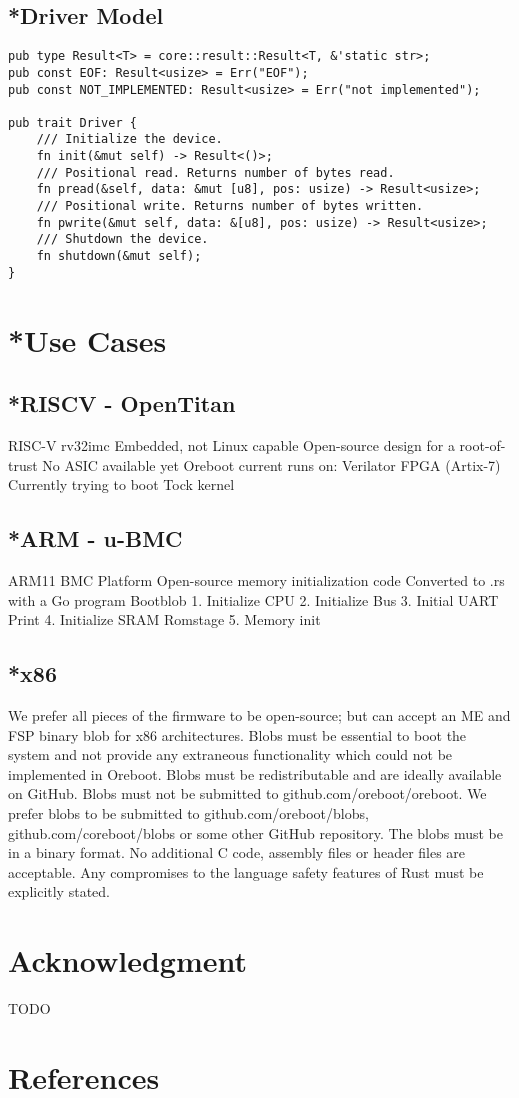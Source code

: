 \documentclass[conference]{IEEEtran}
\begin{document}
\subsection{*Driver Model}

\begin{verbatim}
pub type Result<T> = core::result::Result<T, &'static str>;
pub const EOF: Result<usize> = Err("EOF");
pub const NOT_IMPLEMENTED: Result<usize> = Err("not implemented");

pub trait Driver {
	/// Initialize the device.
	fn init(&mut self) -> Result<()>;
	/// Positional read. Returns number of bytes read.
	fn pread(&self, data: &mut [u8], pos: usize) -> Result<usize>;
	/// Positional write. Returns number of bytes written.
	fn pwrite(&mut self, data: &[u8], pos: usize) -> Result<usize>;
	/// Shutdown the device.
	fn shutdown(&mut self);
}
\end{verbatim}

\section{*Use Cases}

\subsection{*RISCV - OpenTitan}

RISC-V rv32imc
Embedded, not Linux capable
Open-source design for a root-of-trust
No ASIC available yet
Oreboot current runs on:
Verilator
FPGA (Artix-7)
Currently trying to boot Tock kernel

\subsection{*ARM - u-BMC}

ARM11
BMC Platform
Open-source memory initialization code
Converted to .rs with a Go program
Bootblob
1. Initialize CPU
2. Initialize Bus
3. Initial UART Print
4. Initialize SRAM
Romstage
5. Memory init


\subsection{*x86}

We prefer all pieces of the firmware to be open-source; but can accept an ME and FSP binary blob for x86 architectures.
Blobs must be essential to boot the system and not provide any extraneous functionality which could not be implemented in Oreboot.
Blobs must be redistributable and are ideally available on GitHub.
Blobs must not be submitted to github.com/oreboot/oreboot. We prefer blobs to be submitted to github.com/oreboot/blobs, github.com/coreboot/blobs or some other GitHub repository.
The blobs must be in a binary format. No additional C code, assembly files or header files are acceptable.
Any compromises to the language safety features of Rust must be explicitly stated.


\section*{Acknowledgment}

TODO

\section*{References}




\vspace{12pt}
\end{document}

